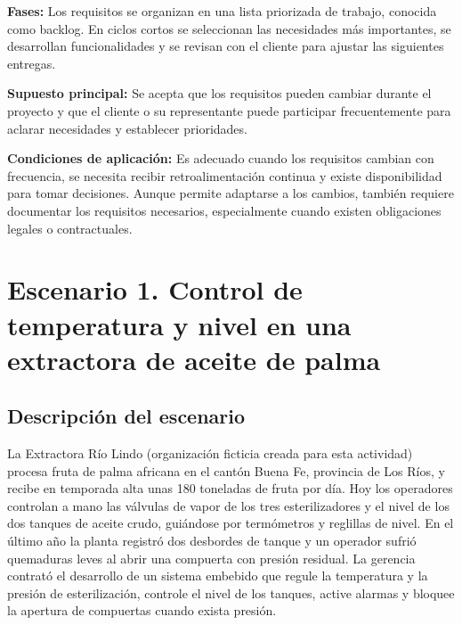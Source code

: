 \documentclass[12pt,a4paper]{article}
\begin{document}
\textbf{Fases:} Los requisitos se organizan en una lista priorizada de trabajo, conocida como backlog. En ciclos cortos se seleccionan las necesidades más importantes, se desarrollan funcionalidades y se revisan con el cliente para ajustar las siguientes entregas.

\textbf{Supuesto principal:} Se acepta que los requisitos pueden cambiar durante el proyecto y que el cliente o su representante puede participar frecuentemente para aclarar necesidades y establecer prioridades.

\textbf{Condiciones de aplicación:} Es adecuado cuando los requisitos cambian con frecuencia, se necesita recibir retroalimentación continua y existe disponibilidad para tomar decisiones. Aunque permite adaptarse a los cambios, también requiere documentar los requisitos necesarios, especialmente cuando existen obligaciones legales o contractuales.




\section{Escenario 1. Control de temperatura y nivel en una extractora de aceite de palma}

\subsection{Descripción del escenario}

La Extractora Río Lindo (organización ficticia creada para esta actividad) procesa fruta de palma africana
en el cantón Buena Fe, provincia de Los Ríos, y recibe en temporada alta unas 180 toneladas de fruta por
día. Hoy los operadores controlan a mano las válvulas de vapor de los tres esterilizadores y el nivel de
los dos tanques de aceite crudo, guiándose por termómetros y reglillas de nivel. En el último año la planta
registró dos desbordes de tanque y un operador sufrió quemaduras leves al abrir una compuerta con
presión residual. La gerencia contrató el desarrollo de un sistema embebido que regule la temperatura
y la presión de esterilización, controle el nivel de los tanques, active alarmas y bloquee la apertura de
compuertas cuando exista presión.
\end{document}

